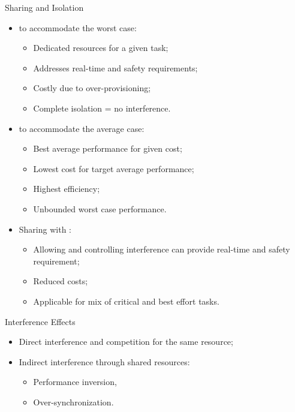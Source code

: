 \begin{frame}{Sharing and Isolation}
  
  \begin{itemize}
  \item {} to accommodate the worst case:
    \begin{itemize}
    \item Dedicated resources for a given task;
    \item Addresses real-time and safety requirements;
    \item Costly due to over-provisioning;
    \item Complete isolation = no interference.
    \end{itemize}\pause
  \item {} to accommodate the average case:
    \begin{itemize}
    \item Best average performance for given cost;
    \item Lowest cost for target average performance;
    \item Highest efficiency;
    \item Unbounded worst case performance.
    \end{itemize}\pause
  \item Sharing with :
    \begin{itemize}
    \item Allowing and controlling interference can provide real-time
      and safety requirement;
    \item Reduced costs;
    \item Applicable for mix of critical and best effort tasks.
    \end{itemize}
  \end{itemize}

\end{frame}

\begin{frame}{Interference Effects}
    \begin{itemize}
    \item Direct interference and competition for the same resource;
    \item Indirect interference through shared resources:
      
      \begin{itemize}
      \item Performance inversion,
      \item Over-synchronization.
      \end{itemize}
    \end{itemize}
\end{frame}

